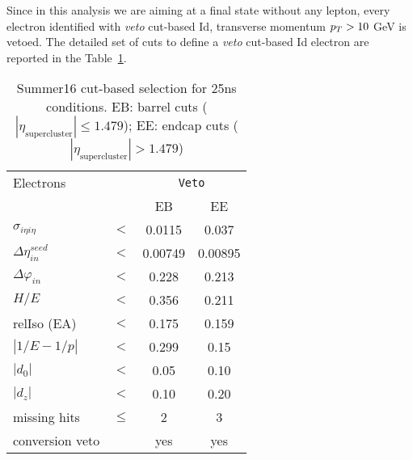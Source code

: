 Since in this analysis we are aiming at a final state without any lepton, every electron identified with \emph{veto} cut-based Id, transverse momentum $p_T > 10$ GeV is vetoed. The detailed set of cuts to define a \emph{veto} cut-based Id electron are reported in the Table~\ref{tab:EGcutBar}.


\begin{table}[htb]
 \centering
    \begin{tabular}{lccc}
     \hline

    Electrons                   &        & \multicolumn{2}{c}{\texttt{Veto}}\\
                                &        & EB      & EE     \\
 \hline
    $\sigma_{i\eta i\eta} $     & $ < $  &0.0115   &0.037  \\
    $\Delta \eta_{in}^{seed}$   & $ < $  &0.00749  &0.00895 \\
    $\Delta \varphi_{in} $      & $ < $  &0.228    &0.213   \\
    $H/E $                      & $ < $  &0.356    &0.211   \\
    relIso (EA)                 & $<$    &0.175    &0.159   \\
    $|1/E - 1/p|$               & $ < $  &0.299    &0.15    \\
    $|d_0|$                     & $ < $  &0.05     &0.10   \\
    $|d_z|$                     & $ < $  &0.10     &0.20   \\
    missing hits                & $\leq$ &2        &3       \\
    conversion veto             &        &  yes    &yes     \\
    
 \hline
\end{tabular}
\caption{ Summer16 cut-based selection for 25ns conditions. EB: barrel cuts ( $|\eta_\text{supercluster}| \leq 1.479$); EE: endcap cuts ( $|\eta_\text{supercluster}| > 1.479$)}
\label{tab:EGcutBar}
\end{table}

